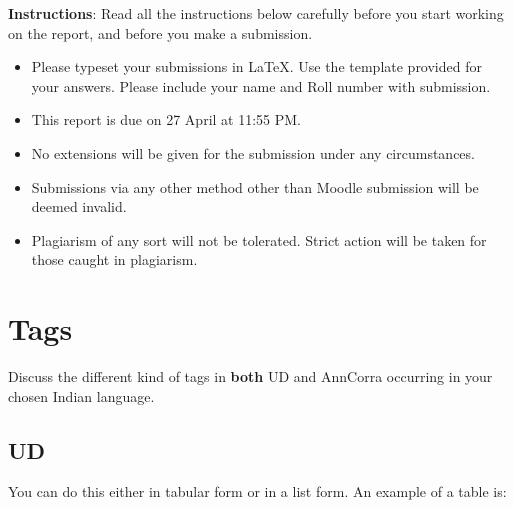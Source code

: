 \documentclass[a4 paper]{article}
\begin{document}

\textbf{Instructions}: Read all the instructions below carefully before you start working on the report, and before you make a submission.
\begin{itemize}
    \item Please typeset your submissions in \LaTeX. Use the template provided for your answers. Please include your name and Roll number with submission. 
    \item This report is due on 27 April at 11:55 PM.
    \item No extensions will be given for the submission under any circumstances.
    \item Submissions via any other method other than Moodle submission will be deemed invalid.
    \item Plagiarism of any sort will not be tolerated. Strict action will be taken for those caught in plagiarism.
\end{itemize}

\section{Tags}

Discuss the different kind of tags in \textbf{both} UD and AnnCorra occurring in your chosen Indian language.

\subsection{UD}

You can do this either in tabular form or in a list form. An example of a table is:
\end{document}
